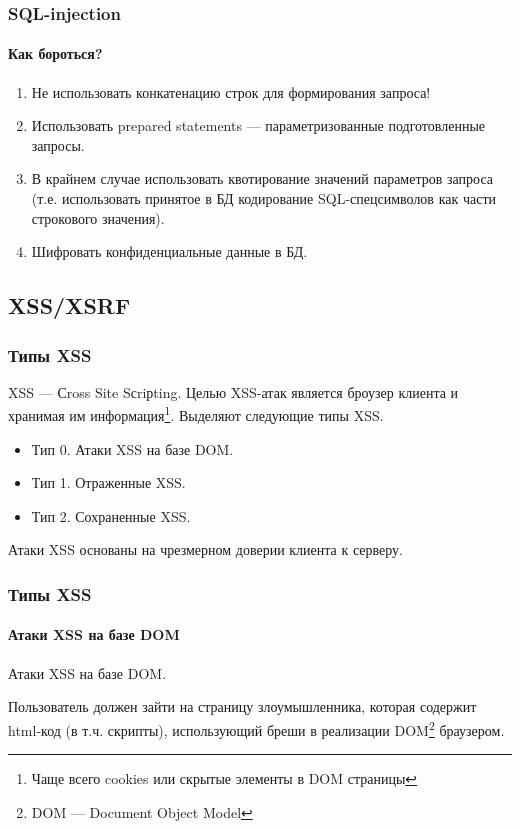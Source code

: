 \begin{frame}
    \frametitle{SQL-injection}
    \framesubtitle{Как бороться?}
    
    \begin{enumerate}
        \item Не использовать конкатенацию строк для формирования запроса!
        \item Использовать prepared statements --- параметризованные подготовленные запросы.
        \item В крайнем случае использовать квотирование значений параметров запроса (т.е. использовать принятое в БД кодирование SQL-спецсимволов как части строкового значения).
        \item Шифровать конфиденциальные данные в БД.
    \end{enumerate}
\end{frame}

    
\subsection{XSS/XSRF}

\begin{frame}
    \frametitle{Типы XSS}
    
    \alert{XSS --- Сross Site Sсriрting}. Целью XSS-атак является броузер клиента и хранимая им информация\footnote{Чаще всего cookies или скрытые элементы в DOM страницы}. Выделяют следующие типы XSS.
    \begin{itemize}
        \item Тип 0. Атаки XSS на базе DOM.
        \item Тип 1. Отраженные XSS. 
        \item Тип 2. Сохраненные XSS.
    \end{itemize}
    
    Атаки XSS основаны на чрезмерном доверии клиента к серверу.
\end{frame}

\begin{frame}
    \frametitle{Типы XSS}
    \framesubtitle{Атаки XSS на базе DOM}

    \alert{Атаки XSS на базе DOM}.
    
    Пользователь должен зайти на страницу злоумышленника, которая содержит html-код (в т.ч. скрипты), использующий бреши в реализации DOM\footnote{DOM --- Document Object Model} браузером.
\end{frame}

